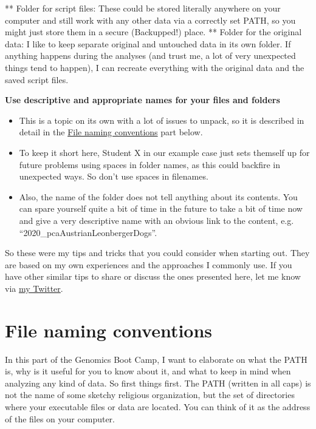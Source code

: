 \documentclass[]{book}
\providecommand{\tightlist}{%
  \setlength{\itemsep}{0pt}\setlength{\parskip}{0pt}}
\begin{document}
** Folder for script files: These could be stored literally anywhere on
your computer and still work with any other data via a correctly set
PATH, so you might just store them in a secure (Backupped!) place. **
Folder for the original data: I like to keep separate original and
untouched data in its own folder. If anything happens during the
analyses (and trust me, a lot of very unexpected things tend to happen),
I can recreate everything with the original data and the saved script
files.

\textbf{Use descriptive and appropriate names for your files and
folders}

\begin{itemize}
\tightlist
\item
  This is a topic on its own with a lot of issues to unpack, so it is
  described in detail in the
  \protect\hyperlink{file-naming-conventions}{File naming conventions}
  part below.
\item
  To keep it short here, Student X in our example case just sets
  themself up for future problems using spaces in folder names, as this
  could backfire in unexpected ways. So don't use spaces in filenames.
\item
  Also, the name of the folder does not tell anything about its
  contents. You can spare yourself quite a bit of time in the future to
  take a bit of time now and give a very descriptive name with an
  obvious link to the content, e.g. ``2020\_pcaAustrianLeonbergerDogs''.
\end{itemize}

So these were my tips and tricks that you could consider when starting
out. They are based on my own experiences and the approaches I commonly
use. If you have other similar tips to share or discuss the ones
presented here, let me know via \href{https://twitter.com/GaborM_ABG}{my
Twitter}.

\hypertarget{file-naming-conventions}{\section{File naming
conventions}\label{file-naming-conventions}}

In this part of the Genomics Boot Camp, I want to elaborate on what the
PATH is, why is it useful for you to know about it, and what to keep in
mind when analyzing any kind of data. So first things first. The PATH
(written in all caps) is not the name of some sketchy religious
organization, but the set of directories where your executable files or
data are located. You can think of it as the address of the files on
your computer.
\end{document}

